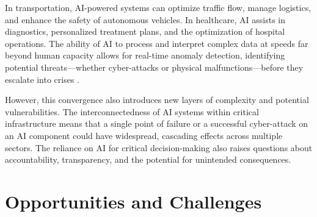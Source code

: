 In transportation, AI-powered systems can optimize traffic flow, manage logistics, and enhance the safety of autonomous vehicles. In healthcare, AI assists in diagnostics, personalized treatment plans, and the optimization of hospital operations. The ability of AI to process and interpret complex data at speeds far beyond human capacity allows for real-time anomaly detection, identifying potential threats—whether cyber-attacks or physical malfunctions—before they escalate into crises \parencite{TechNextCon2023}.

However, this convergence also introduces new layers of complexity and potential vulnerabilities. The interconnectedness of AI systems within critical infrastructure means that a single point of failure or a successful cyber-attack on an AI component could have widespread, cascading effects across multiple sectors. The reliance on AI for critical decision-making also raises questions about accountability, transparency, and the potential for unintended consequences.

\section{Opportunities and Challenges}
\label{sec:opportunities_and_challenges}

